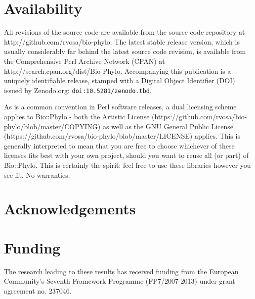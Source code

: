 \documentclass{bioinfo}
\begin{document}
\section{Availability}

All revisions of the source code are available from the source code repository at
http://github.com/rvosa/bio-phylo. The latest stable release version, which is usually 
considerably far behind the latest source code revision, is available from the 
Comprehensive Perl Archive Network (CPAN) at http://search.cpan.org/dist/Bio-Phylo. 
Accompanying this publication is a uniquely identifiable release, stamped with a Digital 
Object Identifier (DOI) issued by Zenodo.org: \texttt{doi:10.5281/zenodo.tbd}.

As is a common convention in Perl software releases, a dual licensing scheme applies to
Bio::Phylo - both the Artistic License 
(https://github.com/rvosa/bio-phylo/blob/master/COPYING) as well as the GNU General Public 
License (https://github.com/rvosa/bio-phylo/blob/master/LICENSE) applies. This is 
generally interpreted to mean that you are free to choose whichever of these licenses fits 
best with your own project, should you want to reuse all (or part) of Bio::Phylo. This is 
certainly the spirit: feel free to use these libraries however you see fit. No warranties.

\section*{Acknowledgements}


\section*{Funding}

The research leading to these results has received funding from the European Community's 
Seventh Framework Programme (FP7/2007-2013) under grant agreement no. 237046.




\end{document}
